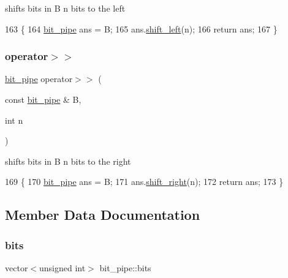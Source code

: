 shifts bits in B n bits to the left 


\begin{DoxyCode}
163                                                \{
164   \hyperlink{classbit__pipe}{bit\_pipe} ans = B;
165   ans.\hyperlink{classbit__pipe_a148fab2b6b3ee730fbaa52539d5a4d74}{shift\_left}(n);
166   \textcolor{keywordflow}{return} ans;
167 \}
\end{DoxyCode}
\mbox{\label{classbit__pipe_a7de74a16947432771bc4001f8fd7079d}} 
\subsubsection{\texorpdfstring{operator$>$$>$}{operator>>}}
{\footnotesize\ttfamily \hyperlink{classbit__pipe}{bit\+\_\+pipe} operator$>$$>$ (\begin{DoxyParamCaption}\item[{const \hyperlink{classbit__pipe}{bit\+\_\+pipe} \&}]{B,  }\item[{int}]{n }\end{DoxyParamCaption})\hspace{0.3cm}{\ttfamily [friend]}}



shifts bits in B n bits to the right 


\begin{DoxyCode}
169                                                \{
170   \hyperlink{classbit__pipe}{bit\_pipe} ans = B;
171   ans.\hyperlink{classbit__pipe_a341a1f62d728a67f730503ca722a7770}{shift\_right}(n);
172   \textcolor{keywordflow}{return} ans;
173 \}
\end{DoxyCode}


\subsection{Member Data Documentation}
\mbox{\label{classbit__pipe_a86f38af1e9736b053728033490476b50}} 
\subsubsection{\texorpdfstring{bits}{bits}}
{\footnotesize\ttfamily vector$<$unsigned int$>$ bit\+\_\+pipe\+::bits\hspace{0.3cm}{\ttfamily [private]}}



